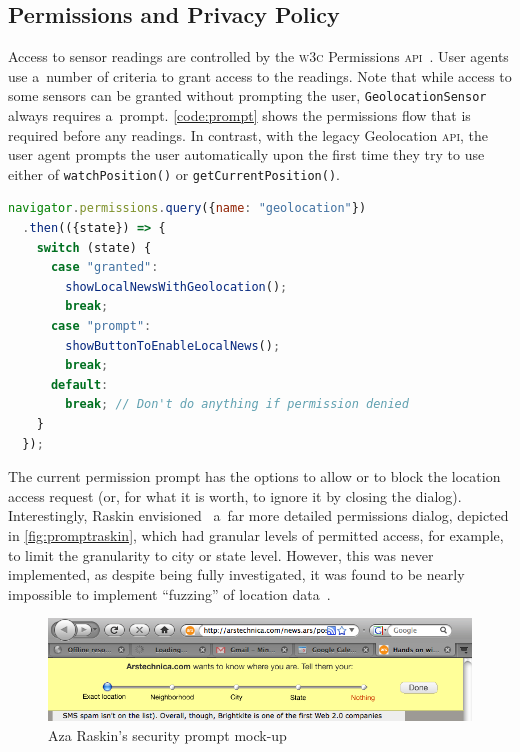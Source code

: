 \documentclass[sigconf,hyphens]{acmart}
\begin{document}
\subsection{Permissions and Privacy Policy}

Access to sensor readings are controlled by the \textsc{w3c} Permissions
\textsc{api}~\cite{lamouri2017permissions}.
User agents use a~number of criteria to grant access to the readings.
Note that while access to some sensors can be granted without prompting the user,
\texttt{GeolocationSensor} always requires a~prompt.
\autoref{code:prompt} shows the permissions flow that is required before any readings.
In contrast, with the legacy Geolocation \textsc{api}, the user agent prompts the user automatically
upon the first time they try to use either of \texttt{watchPosition()} or
\texttt{getCurrentPosition()}.

\begin{lstlisting}[caption={Asking for permission to use \texttt{GeolocationSensor}},
  label=code:prompt, language=JavaScript, float=h] 
navigator.permissions.query({name: "geolocation"})
  .then(({state}) => {
    switch (state) {
      case "granted":
        showLocalNewsWithGeolocation();
        break;
      case "prompt":
        showButtonToEnableLocalNews();
        break;
      default:        
        break; // Don't do anything if permission denied
    }
  });
\end{lstlisting}

The current permission prompt has the options to allow or to block
the location access request (or, for what it is worth, to ignore it by closing the dialog).
Interestingly, Raskin envisioned~\cite{raskin2010geolocation} a~far more detailed permissions
dialog, depicted in \autoref{fig:promptraskin}, which had granular levels of permitted access,
for example, to limit the granularity to city or state level.
However, this was never implemented, as despite being fully investigated, it was found to be nearly
impossible to implement ``fuzzing'' of location data~\cite{thomson2011obscuring}.

\begin{figure}[h]
  \includegraphics[width=0.85\columnwidth]{mockup-prompt.png}
  \caption{Aza Raskin's security prompt mock-up~\cite{raskin2010geolocation}}
  \label{fig:promptraskin}
\end{figure}
\end{document}
